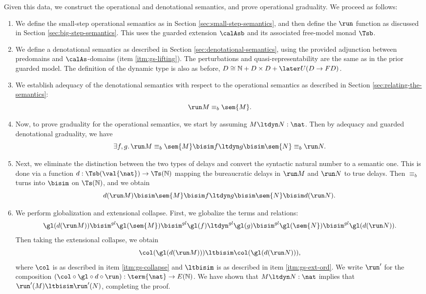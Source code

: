 \documentclass[acmsmall,screen,review,anonymous]{acmart}
\theoremstyle{remark}
\begin{document}
Given this data, we construct the operational and denotational semantics, and
prove operational graduality. We proceed as follows:
%
\begin{enumerate}
  \item We define the small-step operational semantics as in Section
  \ref{sec:small-step-semantics}, and then define the $\run$ function as
  discussed in Section \ref{sec:big-step-semantics}. This uses the guarded
  extension $\calAsb$ and its associated free-model monad $\Tsb$.

  \item We define a denotational semantics as described in Section
  \ref{sec:denotational-semantics}, using the provided adjunction between
  predomains and $\calAs$-domains (item \ref{itm:gs-lifting}). The perturbations
  and quasi-representability are the same as in the prior guarded model. The
  definition of the dynamic type is also as before, $D \cong \mathbb{N} + D
  \times D + \later U (D \to F D)$.

  \item We establish adequacy of the denotational semantics with respect to the
  operational semantics as described in Section \ref{sec:relating-the-semantics}:
  \[ \run M \equiv_b \sem{M}. \]
  \item Now, to prove graduality for the operational semantics, we start by
  assuming $M \ltdyn N : \nat$. Then by adequacy and guarded denotational
  graduality, we have
  \[ \exists f,g.\, \run M \equiv_b \sem{M} \bisim f \ltdyn g \bisim \sem{N} \equiv_b \run N. \]
  \item Next, we eliminate the distinction between the two types of delays and
  convert the syntactic natural number to a semantic one. This is done via a
  function $d : \Tsb(\val{\nat}) \to \Ts(\mathbb{N})$ mapping the bureaucratic
  delays in $\run M$ and $\run N$ to true delays. Then $\equiv_b$ turns into
  $\bisim$ on $\Ts(\mathbb{N})$, and we obtain
  \[ d(\run M) \bisim \sem{M} \bisim f \ltdyn g \bisim \sem{N} \bisim d(\run N). \]
  \item We perform globalization and extensional collapse. First, we globalize
  the terms and relations:
  \[ \gl(d(\run M)) 
    \bisim^{gl} \gl(\sem{M}) 
    \bisim^{gl} \gl(f) 
    \ltdyn^{gl} \gl(g) 
    \bisim^{gl} \gl(\sem{N}) 
    \bisim^{gl} \gl(d(\run N)). \]
  Then taking the extensional collapse, we obtain
  \[ \col(\gl(d(\run M))) \ltbisim \col(\gl(d(\run N))), \]
  where $\col$ is as described in item \ref{itm:gs-collapse} and $\ltbisim$ is
  as described in item \ref{itm:gs-ext-ord}. We write $\run'$ for the
  composition $(\col \circ \gl \circ d \circ \run) : \term{\nat} \to E(\mathbb{N})$. We have
  shown that $M \ltdyn N : \nat$ implies that $\run'(M) \ltbisim \run'(N)$,
  completing the proof.
\end{enumerate}
\end{document}
